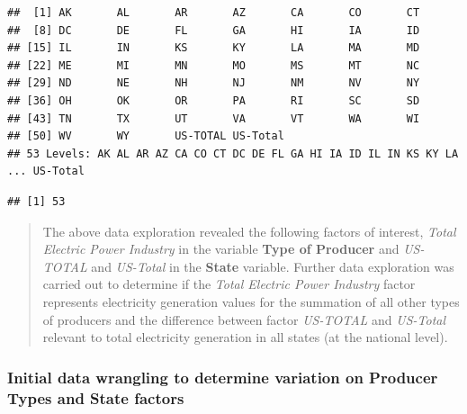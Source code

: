 \documentclass[12pt,]{article}
\newenvironment{Shaded}{\begin{snugshade}}{\end{snugshade}}
\newcommand{\KeywordTok}[1]{\textcolor[rgb]{0.13,0.29,0.53}{\textbf{#1}}}
\newcommand{\DecValTok}[1]{\textcolor[rgb]{0.00,0.00,0.81}{#1}}
\newcommand{\OperatorTok}[1]{\textcolor[rgb]{0.81,0.36,0.00}{\textbf{#1}}}
\newcommand{\NormalTok}[1]{#1}
\begin{document}
\begin{verbatim}
##  [1] AK       AL       AR       AZ       CA       CO       CT      
##  [8] DC       DE       FL       GA       HI       IA       ID      
## [15] IL       IN       KS       KY       LA       MA       MD      
## [22] ME       MI       MN       MO       MS       MT       NC      
## [29] ND       NE       NH       NJ       NM       NV       NY      
## [36] OH       OK       OR       PA       RI       SC       SD      
## [43] TN       TX       UT       VA       VT       WA       WI      
## [50] WV       WY       US-TOTAL US-Total
## 53 Levels: AK AL AR AZ CA CO CT DC DE FL GA HI IA ID IL IN KS KY LA ... US-Total
\end{verbatim}

\begin{Shaded}
\end{Shaded}

\begin{verbatim}
## [1] 53
\end{verbatim}

\begin{quote}
The above data exploration revealed the following factors of interest,
\emph{Total Electric Power Industry} in the variable \textbf{Type of
Producer} and \emph{US-TOTAL} and \emph{US-Total} in the \textbf{State}
variable. Further data exploration was carried out to determine if the
\emph{Total Electric Power Industry} factor represents electricity
generation values for the summation of all other types of producers and
the difference between factor \emph{US-TOTAL} and \emph{US-Total}
relevant to total electricity generation in all states (at the national
level).
\end{quote}

\subsubsection{Initial data wrangling to determine variation on Producer
Types and State
factors}\label{initial-data-wrangling-to-determine-variation-on-producer-types-and-state-factors}
\end{document}

